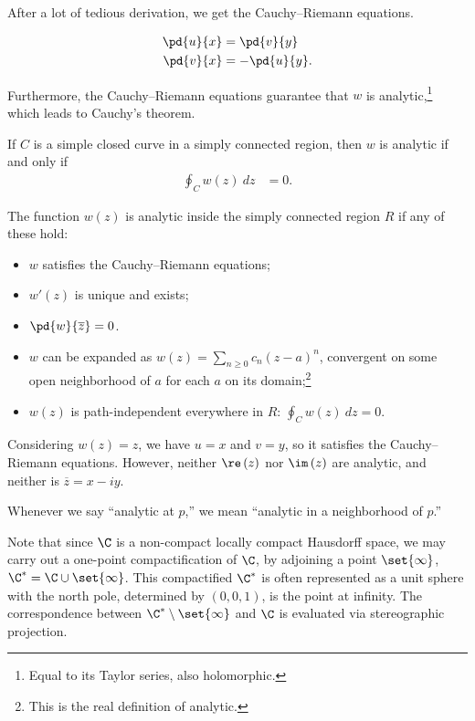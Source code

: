 \documentclass[10pt]{mypackage}
\begin{document}
After a lot of tedious derivation, we get the Cauchy--Riemann equations.
\begin{theorem}
  \begin{align*}
    \pd{u}{x} &= \pd{v}{y}\\
    \pd{v}{x} &= -\pd{u}{y}.
  \end{align*}
\end{theorem}
Furthermore, the Cauchy--Riemann equations guarantee that $w$ is analytic,\footnote{Equal to its Taylor series, also holomorphic.} which leads to Cauchy's theorem.
\begin{theorem}
  If $C$ is a simple closed curve in a simply connected region, then $w$ is analytic if and only if
  \begin{align*}
    \oint_{C}^{} w(z)\:dz &= 0.\label{thm:cauchy_integral_thm}\tag{\textdagger}
  \end{align*}
\end{theorem}
\begin{fact}
The function $w(z)$ is analytic inside the simply connected region $R$ if any of these hold:
\begin{itemize}
  \item $w$ satisfies the Cauchy--Riemann equations;
  \item $w'(z)$ is unique and exists;
  \item $\pd{w}{\overline{z}} = 0$.
  \item $w$ can be expanded as $w(z) = \sum_{n\geq 0}c_n\left( z-a \right)^n$, convergent on some open neighborhood of $a$ for each $a$ on its domain;\footnote{This is the real definition of analytic.}
  \item $w(z)$ is path-independent everywhere in $R$: $\oint_{C}w(z)\:dz = 0$.
\end{itemize}
\end{fact}
\begin{example}
  Considering $w(z) = z$, we have $u=x$ and $v=y$, so it satisfies the Cauchy--Riemann equations. However, neither $\re\left(z\right)$ nor $\im\left(z\right)$ are analytic, and neither is $\overline{z} = x-iy$.
\end{example}
\begin{remark}
Whenever we say ``analytic at $p$,'' we mean ``analytic in a neighborhood of $p$.''
\end{remark}
Note that since $\C$ is a non-compact locally compact Hausdorff space, we may carry out a one-point compactification of $\C$, by adjoining a point $\set{\infty}$, $\C^{\ast} = \C\cup \set{\infty}$. This compactified $\C^{\ast}$ is often represented as a unit sphere with the north pole, determined by $\left(0,0,1\right)$, is the point at infinity. The correspondence between $\C^{\ast}\setminus\set{\infty}$ and $\C$ is evaluated via stereographic projection.\newline
\end{document}
